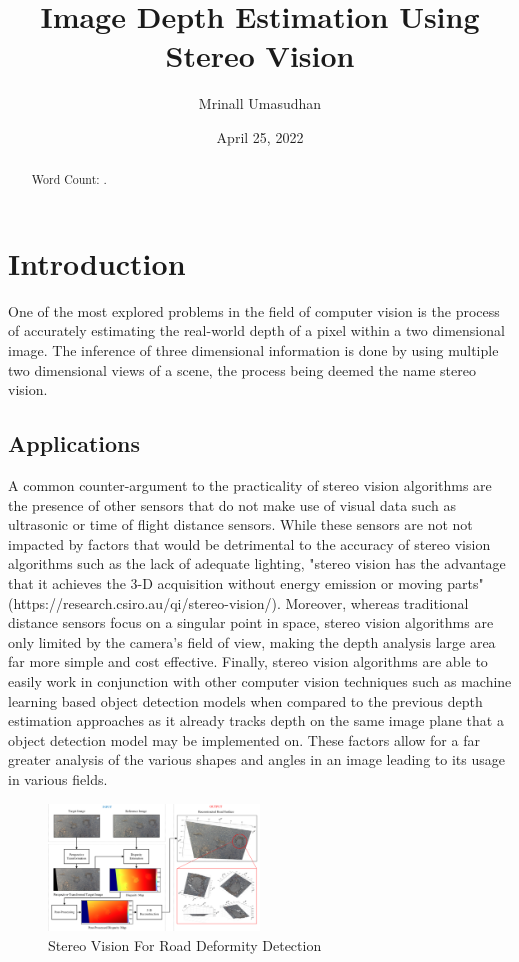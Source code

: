\documentclass[11pt]{scrartcl}
\begin{document}
\title{Image Depth Estimation Using Stereo Vision}
\author{Mrinall Umasudhan}
\date{April 25, 2022}
\maketitle
{}


\begin{abstract}
  Word Count: .
\end{abstract}
\tableofcontents


\newpage

\section{Introduction}
One of the most explored problems in the field of computer vision is the process
of accurately estimating the real-world depth of a pixel within a two dimensional
image. The inference of three dimensional information is done by using multiple two
dimensional views of a scene, the process being deemed the name stereo vision.

\subsection{Applications}
A common counter-argument to the practicality of stereo vision algorithms
are the presence of other sensors that do not make use of visual data such
as ultrasonic or time of flight distance sensors. While these sensors are not
not impacted by factors that would be detrimental to the accuracy of stereo
vision algorithms such as the lack of adequate lighting,
"stereo vision has the advantage that it achieves the 3-D acquisition without
energy emission or moving parts" (https://research.csiro.au/qi/stereo-vision/). Moreover,
whereas traditional distance sensors focus on a singular point in space, stereo vision
algorithms are only limited by the camera's field of view, making the depth analysis
large area far more simple and cost effective. Finally, stereo vision algorithms are able
to easily work in conjunction with other
computer vision techniques such as machine learning based object detection
models when compared to the previous depth estimation approaches as it already
tracks depth on the same image plane that a object detection model may be implemented on.
These factors allow for a far greater analysis of the
various shapes and angles in an image leading to its usage in various fields.
\\
\begin{figure}
  \centering
  \includegraphics[width=0.5\textwidth]{img1.png}
  \caption{\label{fig:frog1}Stereo Vision For Road Deformity Detection}
\end{figure}
\end{document}
